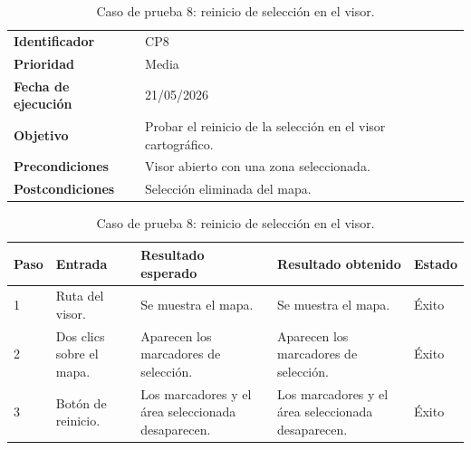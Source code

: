\begin{table}[]
	\centering
	\footnotesize
	\renewcommand{\arraystretch}{1.2}
	\begin{tabularx}{\textwidth}{p{3.2cm} X}
		\toprule
		\textbf{Identificador} & CP8 \\
		\textbf{Prioridad} & Media \\
		\textbf{Fecha de ejecución} & 21/05/2026 \\
		\textbf{Objetivo} & Probar el reinicio de la selección en el visor cartográfico. \\
		\textbf{Precondiciones} & Visor abierto con una zona seleccionada. \\
		\textbf{Postcondiciones} & Selección eliminada del mapa. \\
		\midrule
	\end{tabularx}
	\begin{tabularx}{\textwidth}{p{0.8cm} p{3.2cm} X X p{1.3cm}}
		\textbf{Paso} & \textbf{Entrada} & \textbf{Resultado esperado} & \textbf{Resultado obtenido} & \textbf{Estado} \\
		\midrule
		1 & Ruta del visor. & Se muestra el mapa. & Se muestra el mapa. & Éxito \\
		2 & Dos clics sobre el mapa. & Aparecen los marcadores de selección. & Aparecen los marcadores de selección. & Éxito \\
		3 & Botón de reinicio. & Los marcadores y el área seleccionada desaparecen. & Los marcadores y el área seleccionada desaparecen. & Éxito \\
		\bottomrule
	\end{tabularx}
	\caption{Caso de prueba 8: reinicio de selección en el visor.}
	\label{tab:cp8}
\end{table}

